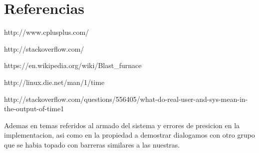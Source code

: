 \documentclass[12pt,a4paper]{article}
\begin{document}
\section{Referencias}

http://www.cplusplus.com/

http://stackoverflow.com/

https://en.wikipedia.org/wiki/Blast\_furnace 

http://linux.die.net/man/1/time

http://stackoverflow.com/questions/556405/what-do-real-user-and-sys-mean-in-the-output-of-time1

Ademas en temas referidos al armado del sistema y errores de presicion en la implementacion, asi como en la propiedad a demostrar dialogamos con otro grupo que se habia topado con barreras similares a las nuestras. 
\end{document}
